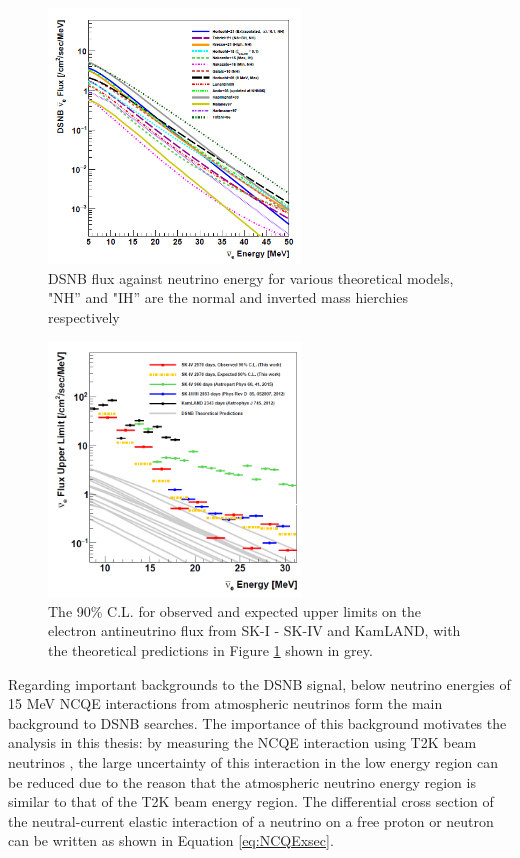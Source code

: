 \begin{figure}
    \centering
    \includegraphics[width=0.6\textwidth]{Figures/DSNB_energy.png}
    \caption{DSNB flux against neutrino energy for various theoretical models, "NH'' and "IH'' are the normal and inverted mass hierchies respectively}
    \label{fig:DSNBenergy}
\end{figure}

\begin{figure}
    \centering
    \includegraphics[width=0.6\textwidth]{Figures/DSNBlimit.png}
    \caption{The 90\% C.L. for observed and expected upper limits on the electron antineutrino flux from SK-I - SK-IV and KamLAND, with the theoretical predictions in Figure \ref{fig:DSNBenergy} shown in grey.}
    \label{fig:DSNBlimit}
\end{figure}


Regarding important backgrounds to the DSNB signal, below neutrino energies of 15 MeV NCQE interactions from atmospheric neutrinos form the main background to DSNB searches. The importance of this background motivates the analysis in this thesis: by measuring the NCQE interaction using T2K beam neutrinos \cite{abe2021diffuse}, the large uncertainty of this interaction in the low energy region can be reduced due to the reason that the atmospheric neutrino energy region is similar to that of the T2K beam energy region. The differential cross section of the neutral-current elastic interaction of a neutrino on a free proton or neutron can be written as shown in Equation \ref{eq:NCQExsec}. 

